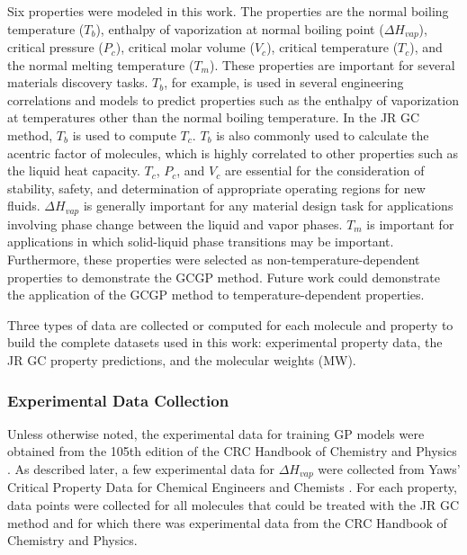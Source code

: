 \documentclass[journal=jacsat,manuscript=article, ]{achemso}
\begin{document}
Six properties were modeled in this work. The properties are the normal boiling temperature ($T_b$), enthalpy of vaporization at normal boiling point ($\Delta H_{vap}$), critical pressure ($P_c$), critical molar volume ($V_c$), critical temperature ($T_c$), and the normal melting temperature ($T_m$).
These properties are important for several materials discovery tasks. $T_b$, for example, is used in several engineering correlations and models to predict properties such as the enthalpy of vaporization at temperatures other than the normal boiling temperature. In the JR GC method, $T_b$ is used to compute $T_c$. $T_b$ is also commonly used to calculate the acentric factor of molecules, which is highly correlated to other properties such as the liquid heat capacity. 
$T_c$, $P_c$, and $V_c$ are essential for the consideration of stability, safety, and determination of appropriate operating regions for new fluids. %
$\Delta H_{vap}$ is generally important for any material design task for applications involving phase change between the liquid and vapor phases. 
$T_m$ is important for applications in which solid-liquid phase transitions may be important.
Furthermore, these properties were selected as non-temperature-dependent properties to demonstrate the GCGP method. Future work could demonstrate the application of the GCGP method to temperature-dependent properties.

 Three types of data are collected or computed for each molecule and property to build the complete datasets used in this work: experimental property data, the JR GC property predictions, and the molecular weights (MW).

\subsubsection{Experimental Data Collection}

Unless otherwise noted, the experimental data for training GP models were obtained from the 105th edition of the CRC Handbook of Chemistry and Physics \cite{bookRumble2023}. As described later, a few experimental data for $\Delta H_{vap}$ were collected from Yaws' Critical Property Data for Chemical Engineers and Chemists \cite{yaws-critical-property}.
For each property, data points were collected for all molecules that could be treated with the JR GC method and for which there was experimental data from the CRC Handbook of Chemistry and Physics.
\end{document}
